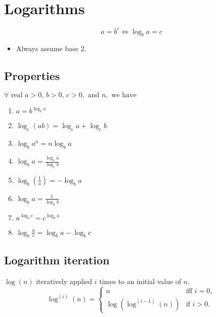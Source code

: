 \documentclass{article}
\begin{document}
\newpage

\section{Logarithms}
\begin{definition}
    \begin{equation}
        a = b^c \iff \log_b a = c
    \end{equation}
    \begin{itemize}
        \item Always assume base 2.
    \end{itemize}
\end{definition}

\subsection{Properties}
\begin{definition}
    $\forall \text{ real } a>0 \text{, } b>0 \text{, } c>0, \text{ and } n, \text{ we have}$
    \begin{enumerate}
        \item \( a = b^{\log_b a} \)
        \item \( \log_c(ab) = \log_c a + \log_c b \)
        \item \( \log_b a^n = n \log_b a \)
        \item \( \log_b a = \frac{\log_c a}{\log_c b} \)
        \item \( \log_b \left(\frac{1}{a}\right) = -\log_b a \)
        \item \( \log_b a = \frac{1}{\log_a b} \)
        \item \( a^{\log_b c} = c^{\log_b a} \)
        \item \( \log_b \frac{a}{c} = \log_b a - \log_b c\)
    \end{enumerate}
\end{definition}

\subsection{Logarithm iteration}
\begin{definition}
    $\log(n)$ iteratively applied $i$ times to an initial value of $n$.
    \begin{equation}
        \log^{(i)}(n) = 
        \begin{cases}
            n & \text{iff } i = 0, \\
            \log\left(\log^{(i-1)}(n)\right) & \text{if } i > 0.
        \end{cases}
    \end{equation}
\end{definition}
\end{document}
